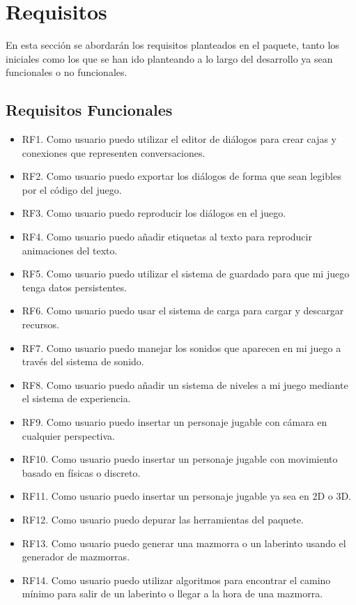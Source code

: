 \section{Requisitos}

En esta sección se abordarán los requisitos planteados en el paquete, tanto los iniciales como los que se han ido planteando a lo largo del desarrollo ya sean funcionales o no funcionales. 

\subsection{Requisitos Funcionales}
\begin{itemize}
    \item RF1. Como usuario puedo utilizar el editor de diálogos para crear cajas y conexiones que representen conversaciones.
    \item RF2. Como usuario puedo exportar los diálogos de forma que sean legibles por el código del juego.
    \item RF3. Como usuario puedo reproducir los diálogos en el juego.
    \item RF4. Como usuario puedo añadir etiquetas al texto para reproducir animaciones del texto.
    \item RF5. Como usuario puedo utilizar el sistema de guardado para que mi juego tenga datos persistentes.
    \item RF6. Como usuario puedo usar el sistema de carga para cargar y descargar recursos.
    \item RF7. Como usuario puedo manejar los sonidos que aparecen en mi juego a través del sistema de sonido.
    \item RF8. Como usuario puedo añadir un sistema de niveles a mi juego mediante el sistema de experiencia.
    \item RF9. Como usuario puedo insertar un personaje jugable con cámara en cualquier perspectiva.
    \item RF10. Como usuario puedo insertar un personaje jugable con movimiento basado en físicas o discreto.
    \item RF11. Como usuario puedo insertar un personaje jugable ya sea en 2D o 3D.
    \item RF12. Como usuario puedo depurar las herramientas del paquete.
    \item RF13. Como usuario puedo generar una mazmorra o un laberinto usando el generador de mazmorras.
    \item RF14. Como usuario puedo utilizar algoritmos para encontrar el camino mínimo para salir de un laberinto o llegar a la hora de una mazmorra.

\end{itemize}
